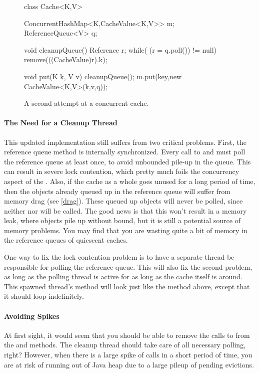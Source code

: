 \begin{wrapfigure}{l}{0.61\textwidth}
\centering
\begin{figurelisting}
class Cache<K,V> {
  ConcurrentHashMap<K,CacheValue<K,V>> m;
  ReferenceQueue<V> q;
   
  void cleanupQueue() {
    Reference r;
    while( (r = q.poll()) != null)
       remove(((CacheValue)r).k);
  }
   
  void put(K k, V v) {
    cleanupQueue();
    m.put(key,new CacheValue<K,V>(k,v,q));
  }
}
\end{figurelisting}
\caption{A second attempt at a concurrent cache.}
\label{fig:concurrent-cache-second-attempt}
\end{wrapfigure}

\paragraph{The Need for a Cleanup Thread}
This updated implementation still suffers from two critical problems. First, the
reference queue  method is internally synchronized. Every call to
 and  must poll the reference queue at least once, to avoid
unbounded pile-up in the queue. This can result in severe lock contention, which
pretty much foils the concurrency aspect of the .
Also, if the cache as a whole goes unused for a long period of time, then the
objects already queued up in the reference queue will suffer from memory drag
(see \autoref{drag}). These queued up objects will never be polled, since
neither  nor  will be called. The good news is that this
won't result in a memory leak, where objects pile up without bound, but it is
still a potential source of memory problems. You may find that you are wasting
quite a bit of memory in the reference queues of quiescent caches.

One way to fix the lock contention problem is to have a separate thread be
responsible for polling the reference queue. This will also fix the second
problem, as long as the polling thread is active for as long as the cache itself
is around. This spawned thread's  method will look just like the
 method above, except that it should loop indefinitely.

\paragraph{Avoiding Spikes}
At first sight, it would seem that you should be able to remove the calls to
 from the  and  methods. The cleanup
thread should take care of all necessary polling, right? However, when there is
a large spike of  calls in a short period of time, you are at risk of
running out of Java heap due to a large pileup of pending evictions.

